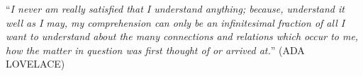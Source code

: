 \begin{epigrafe}
    \vspace*{\fill}
{%
	\noindent\hspace{.5\textwidth}
	{\begin{minipage}{.5\textwidth}
		\begin{flushright}
			``\textit{I never am really satisfied that I understand anything; because, understand it well as I may, my comprehension can only be an infinitesimal fraction of all I want to understand about the many connections and relations which occur to me, how the matter in question was first thought of or arrived at.}'' (ADA LOVELACE)
		\end{flushright}
	\end{minipage}}%
	\vspace*{3cm}
}%
\end{epigrafe}
